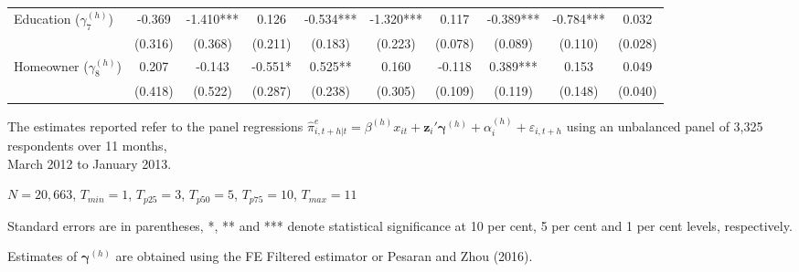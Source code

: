 \begin{table}[!h]
\begin{threeparttable}
\begin{tabular}{|l|ccc|ccc|ccc|}
Education ($\gamma^{(h)}_7$) & -0.369 & -1.410*** & 0.126 & -0.534*** & -1.320*** & 0.117 & -0.389*** & -0.784*** & 0.032 \\ 
 & (0.316) & (0.368) & (0.211)& (0.183) & (0.223) & (0.078)& (0.089) & (0.110) & (0.028) \\ \bottomrule
Homeowner ($\gamma^{(h)}_8$) & 0.207 & -0.143 & -0.551* & 0.525** & 0.160 & -0.118 & 0.389*** & 0.153 & 0.049 \\ 
 & (0.418) & (0.522) & (0.287)& (0.238) & (0.305) & (0.109)& (0.119) & (0.148) & (0.040) \\ \bottomrule
\end{tabular} 
\begin{tablenotes} 
\item The  estimates reported refer to the panel regressions  $\hat{\pi}^e_{i,t+h|t}=\beta^{(h)} x_{i t}+\mathbf{z}_{i}\prime\mathbf{\gamma }^{(h)}+\alpha_i^{(h)}+\varepsilon_{i,t+h}$  using an unbalanced panel of 3,325 respondents over 11 months,\\  March 2012 to January 2013.
\item $N=20,663$, $T_{min}=1$, $T_{p25}=3$, $T_{p50}=5$, $T_{p75}=10$,    $T_{max}=11$
\item Standard errors are in parentheses, *, ** and *** denote statistical significance at 10 per cent, 5 per cent and 1 per cent levels, respectively. 
\item Estimates of $\mathbf{\gamma}^{(h)}$ are obtained using the  FE Filtered estimator or Pesaran and Zhou (2016). 
  \end{tablenotes} 
\end{threeparttable} 
\end{table} 
